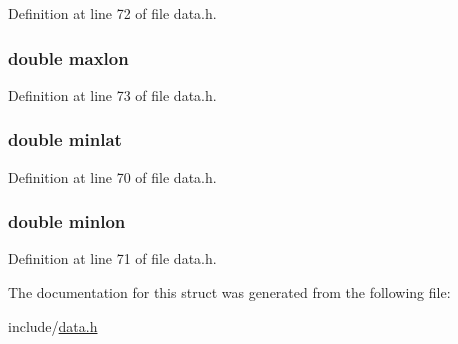 Definition at line 72 of file data.\+h.

\subsubsection[{\texorpdfstring{maxlon}{maxlon}}]{\setlength{\rightskip}{0pt plus 5cm}double maxlon}\hypertarget{struct_bounds_a2ac2c59e3c0eb6ec8661c8ff1ea04b83}{}\label{struct_bounds_a2ac2c59e3c0eb6ec8661c8ff1ea04b83}


Definition at line 73 of file data.\+h.

\subsubsection[{\texorpdfstring{minlat}{minlat}}]{\setlength{\rightskip}{0pt plus 5cm}double minlat}\hypertarget{struct_bounds_ae6882148ee59d0266307fd7a39b8945c}{}\label{struct_bounds_ae6882148ee59d0266307fd7a39b8945c}


Definition at line 70 of file data.\+h.

\subsubsection[{\texorpdfstring{minlon}{minlon}}]{\setlength{\rightskip}{0pt plus 5cm}double minlon}\hypertarget{struct_bounds_a59ff75088f2d17feafb6a6cb7b52cc0c}{}\label{struct_bounds_a59ff75088f2d17feafb6a6cb7b52cc0c}


Definition at line 71 of file data.\+h.



The documentation for this struct was generated from the following file\+:\begin{DoxyCompactItemize}
\item 
include/\hyperlink{data_8h}{data.\+h}\end{DoxyCompactItemize}
